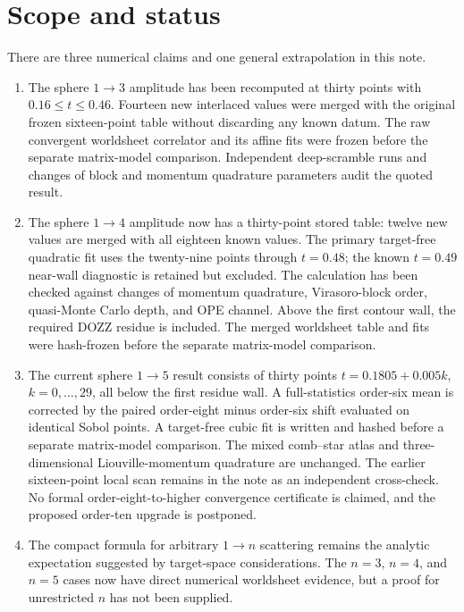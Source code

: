 \documentclass[11pt]{article}
\begin{document}
\section{Scope and status}

There are three numerical claims and one general extrapolation in this note.

\begin{enumerate}
  \item The sphere $1\to3$ amplitude has been recomputed at thirty points
  with $0.16\leq t\leq0.46$.  Fourteen new interlaced values were merged with
  the original frozen sixteen-point table without discarding any known datum.
  The raw convergent worldsheet correlator and its affine fits were frozen
  before the separate matrix-model comparison.  Independent deep-scramble
  runs and changes of block and momentum quadrature parameters audit the
  quoted result.

  \item The sphere $1\to4$ amplitude now has a thirty-point stored table:
  twelve new values are merged with all eighteen known values.  The primary
  target-free quadratic fit uses the twenty-nine points through $t=0.48$;
  the known $t=0.49$ near-wall diagnostic is retained but excluded.  The
  calculation has been checked against changes of momentum quadrature,
  Virasoro-block order, quasi-Monte Carlo depth, and OPE channel.  Above the
  first contour wall, the required DOZZ residue is included.  The merged
  worldsheet table and fits were hash-frozen before the separate matrix-model
  comparison.

  \item The current sphere $1\to5$ result consists of thirty points
  $t=0.1805+0.005k$, $k=0,\ldots,29$, all below the first residue wall.  A
  full-statistics order-six mean is corrected by the paired order-eight
  minus order-six shift evaluated on identical Sobol points.  A target-free
  cubic fit is written and hashed before a separate matrix-model comparison.
  The mixed comb--star atlas and three-dimensional Liouville-momentum
  quadrature are unchanged.  The earlier sixteen-point local scan remains
  in the note as an independent cross-check.  No formal order-eight-to-higher
  convergence certificate is claimed, and the proposed order-ten upgrade is
  postponed.

  \item The compact formula for arbitrary $1\to n$ scattering remains the
  analytic expectation suggested by target-space considerations.  The
  $n=3$, $n=4$, and $n=5$ cases now have direct numerical worldsheet evidence, but a
  proof for unrestricted $n$ has not been supplied.
\end{enumerate}
\end{document}
